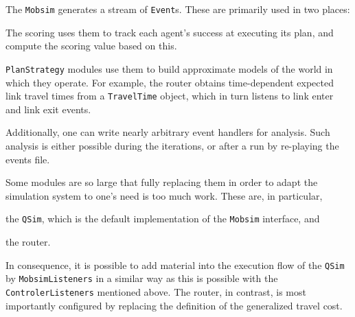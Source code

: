 The \lstinline$Mobsim$ generates a stream of \lstinline$Event$s.  These are primarily used in two places:
\begin{compactitem}

\item The scoring uses them to track each agent's success at executing its plan, and compute the scoring value based on this.

\item \lstinline$PlanStrategy$ modules use them to build approximate models of the world in which they operate.  For example, the router obtains time-dependent expected link travel times from a \lstinline$TravelTime$ object, which in turn listens to link enter and link exit events.
  
\end{compactitem}
Additionally, one can write nearly arbitrary event handlers for analysis.
Such analysis is either possible during the iterations, or after a run by re-playing the events file.



Some modules are so large that fully replacing them in order to adapt the simulation system to one's need is too much work.  These are, in particular,
\begin{compactitem}
\item the \lstinline$QSim$, which is the default implementation of the \lstinline$Mobsim$ interface, and
\item the router.
\end{compactitem}
In consequence, it is possible to add material into the execution flow of the \lstinline$QSim$ by \lstinline$MobsimListeners$ in a similar way as this is possible with the \lstinline$ControlerListeners$ mentioned above.
%
The router, in contrast, is most importantly configured by replacing the definition of the generalized travel cost. 

